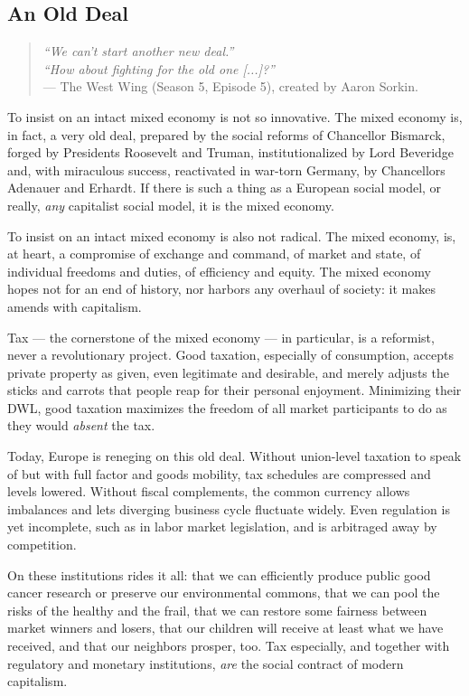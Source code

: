 \documentclass[11pt,a4paper,oneside,openright]{article}
\begin{document}
\subsection[An Old Deal]{An Old Deal} %

\begin{quote}
	\emph{``We can't start another new deal.''\\
	``How about fighting for the old one [...]?''\\}
	 --- The West Wing (Season 5, Episode 5), created by Aaron Sorkin.
\end{quote}

To insist on an intact mixed economy is not so innovative. 
The mixed economy is, in fact, a very old deal, prepared by the social reforms of Chancellor Bismarck, forged by Presidents Roosevelt and Truman, institutionalized by Lord Beveridge and, with miraculous success, reactivated in war-torn Germany, by Chancellors Adenauer and Erhardt. 
If there is such a thing as a European social model, or really, \emph{any} capitalist social model, it is the mixed economy.

To insist on an intact mixed economy is also not radical. 
The mixed economy, is, at heart, a compromise of exchange and command, of market and state, of individual freedoms and duties, of efficiency and equity. 
The mixed economy hopes not for an end of history, nor harbors any overhaul of society: 
it makes amends with capitalism.

Tax --- the cornerstone of the mixed economy --- in particular, is a reformist, never a revolutionary project. 
Good taxation, especially of consumption, accepts private property as given, even legitimate and desirable, and merely adjusts the sticks and carrots that people reap for their personal enjoyment. 
Minimizing their \gls{DWL}, good taxation maximizes the freedom of all market participants to do as they would \emph{absent} the tax.

Today, Europe is reneging on this old deal. 
Without union-level taxation to speak of but with full factor and goods mobility, tax schedules are compressed and levels lowered. 
Without fiscal complements, the common currency allows imbalances and lets diverging business cycle fluctuate widely. 
Even regulation is yet incomplete, such as in labor market legislation, and is arbitraged away by competition. 

On these institutions rides it all: 
that we can efficiently produce public good cancer research or preserve our environmental commons, that we can pool the risks of the healthy and the frail, that we can restore some fairness between market winners and losers, that our children will receive at least what we have received, and that our neighbors prosper, too. 
Tax especially, and together with regulatory and monetary institutions, \emph{are} the social contract of modern capitalism. 
\end{document}
